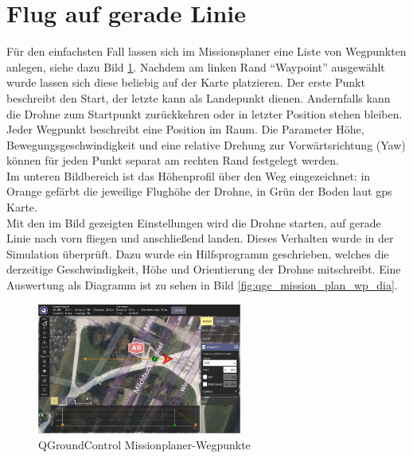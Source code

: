 \section{Flug auf gerade Linie}
Für den einfachsten Fall lassen sich im Missionsplaner eine Liste von Wegpunkten anlegen, siehe dazu Bild \ref{fig:qgc_mission_plan_wp}. Nachdem am linken Rand \enquote{Waypoint} ausgewählt wurde lassen sich diese beliebig auf der Karte platzieren. Der erste Punkt beschreibt den Start, der letzte kann als Landepunkt dienen. Andernfalls kann die Drohne zum Startpunkt zurückkehren oder in letzter Position stehen bleiben.\\
Jeder Wegpunkt beschreibt eine Position im Raum. Die Parameter Höhe, Bewegungsgeschwindigkeit und eine relative Drehung zur Vorwärtsrichtung (Yaw) können für jeden Punkt separat am rechten Rand festgelegt werden.\\
Im unteren Bildbereich ist das Höhenprofil über den Weg eingezeichnet: in Orange gefärbt die jeweilige Flughöhe der Drohne, in Grün der Boden laut \gls{gps} Karte.\\
Mit den im Bild gezeigten Einstellungen wird die Drohne starten, auf gerade Linie nach vorn fliegen und anschließend landen. Dieses Verhalten wurde in der Simulation überprüft. Dazu wurde ein Hilfsprogramm geschrieben, welches die derzeitige Geschwindigkeit, Höhe und Orientierung der Drohne mitschreibt. Eine Auswertung als Diagramm ist zu sehen in Bild \ref{fig:qgc_mission_plan_wp_dia}.

\begin{figure}[h]
    \centering
    \includegraphics[width=0.6\textwidth]{images/mission_plan_mission.png}
    \caption[QGroundControl Missionplaner-Wegpunkte]{QGroundControl Missionplaner-Wegpunkte}
    \label{fig:qgc_mission_plan_wp}
\end{figure}


